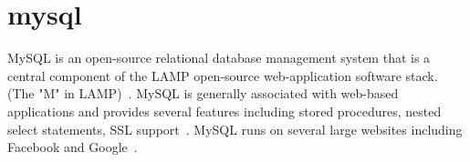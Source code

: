 \section{mysql}
MySQL is an open-source relational database management system that is a 
central component of the LAMP open-source web-application software stack. 
(The "M" in LAMP)~\cite{hid-sp18-407-mysql}.  MySQL is generally 
associated with web-based applications and provides several features including
stored procedures, nested select statements, SSL support~\cite{hid-sp18-407-mysql}.
MySQL runs on several large websites including Facebook and
Google~\cite{hid-sp18-407-mysql}.

